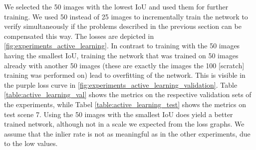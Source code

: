 We selected the 50 images with the lowest IoU and used them for further training. We used 50 instead of 25 images to incrementally train the network to verify simultaneously if the problems described in the previous section can be compensated this way. The losses are depicted in \fig \ref{fig:experiments_active_learning}. In contrast to training with the 50 images having the smallest IoU, training the network that was trained on 50 images already with another 50 images (these are exactly the images the 100 [scratch] training was performed on) lead to overfitting of the network. This is visible in the purple loss curve in \fig \ref{fig:experiments_active_learning_validation}. Table \ref{table:active_learning_val} shows the metrics on the respective validation sets of the experiments, while Tabel \ref{table:active_learning_test} shows the metrics on test scene 7. Using the 50 images with the smallest IoU does yield a better trained network, although not in a scale we expected from the loss graphs. We assume that the inlier rate is not as meaningful as in the other experiments, due to the low values.

